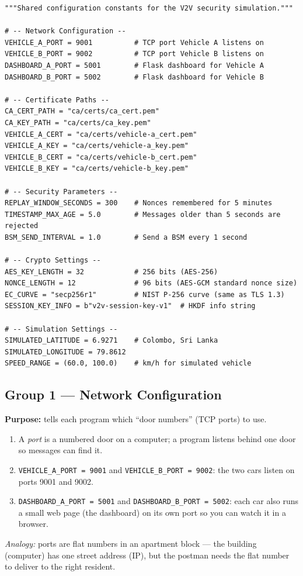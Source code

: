 \documentclass[11pt,a4paper]{article}
\begin{document}
\begin{lstlisting}[style=py,caption={config.py --- shared constants for the
whole simulation (decorative dashes in the original comments shortened to
plain ASCII for printing).}]
"""Shared configuration constants for the V2V security simulation."""

# -- Network Configuration --
VEHICLE_A_PORT = 9001          # TCP port Vehicle A listens on
VEHICLE_B_PORT = 9002          # TCP port Vehicle B listens on
DASHBOARD_A_PORT = 5001        # Flask dashboard for Vehicle A
DASHBOARD_B_PORT = 5002        # Flask dashboard for Vehicle B

# -- Certificate Paths --
CA_CERT_PATH = "ca/certs/ca_cert.pem"
CA_KEY_PATH = "ca/certs/ca_key.pem"
VEHICLE_A_CERT = "ca/certs/vehicle-a_cert.pem"
VEHICLE_A_KEY = "ca/certs/vehicle-a_key.pem"
VEHICLE_B_CERT = "ca/certs/vehicle-b_cert.pem"
VEHICLE_B_KEY = "ca/certs/vehicle-b_key.pem"

# -- Security Parameters --
REPLAY_WINDOW_SECONDS = 300    # Nonces remembered for 5 minutes
TIMESTAMP_MAX_AGE = 5.0        # Messages older than 5 seconds are rejected
BSM_SEND_INTERVAL = 1.0        # Send a BSM every 1 second

# -- Crypto Settings --
AES_KEY_LENGTH = 32            # 256 bits (AES-256)
NONCE_LENGTH = 12              # 96 bits (AES-GCM standard nonce size)
EC_CURVE = "secp256r1"         # NIST P-256 curve (same as TLS 1.3)
SESSION_KEY_INFO = b"v2v-session-key-v1"  # HKDF info string

# -- Simulation Settings --
SIMULATED_LATITUDE = 6.9271    # Colombo, Sri Lanka
SIMULATED_LONGITUDE = 79.8612
SPEED_RANGE = (60.0, 100.0)    # km/h for simulated vehicle
\end{lstlisting}

\subsection{Group 1 --- Network Configuration}
\textbf{Purpose:} tells each program which ``door numbers'' (TCP ports) to use.
\begin{enumerate}
  \item A \emph{port} is a numbered door on a computer; a program listens behind
        one door so messages can find it.
  \item \texttt{VEHICLE\_A\_PORT = 9001} and \texttt{VEHICLE\_B\_PORT = 9002}:
        the two cars listen on ports 9001 and 9002.
  \item \texttt{DASHBOARD\_A\_PORT = 5001} and \texttt{DASHBOARD\_B\_PORT = 5002}:
        each car also runs a small web page (the dashboard) on its own port so
        you can watch it in a browser.
\end{enumerate}
\emph{Analogy:} ports are flat numbers in an apartment block --- the building
(computer) has one street address (IP), but the postman needs the flat number
to deliver to the right resident.
\end{document}
